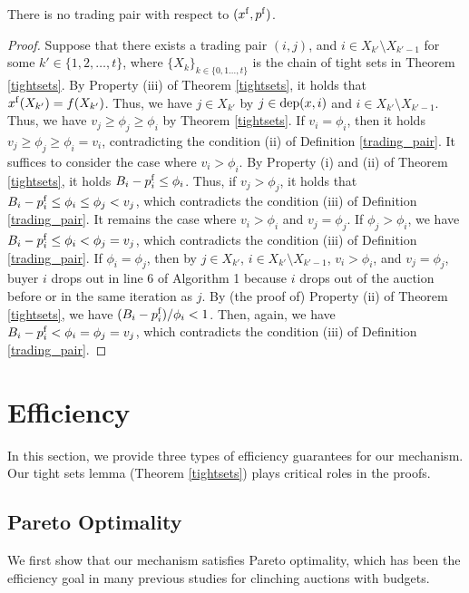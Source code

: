 \documentclass[letterpaper,11pt]{article}
\begin{document}
\begin{proposition}
\label{no_trading}
There is no trading pair with respect to $(x^{\rm f}, p^{\rm f})$.
\end{proposition}
\begin{proof}
Suppose that there exists a trading pair $(i, j)$, and $i\in X_{k'}\setminus X_{k'-1}$ for some $k'\in \{1,2,\ldots,t\}$, where $\{X_k\}_{k\in \{0,1\ldots,t\}}$ is the chain of tight sets in Theorem \ref{tightsets}.
By Property (iii) of Theorem \ref{tightsets}, it holds that $x^{\rm f}(X_{k'})=f(X_{k'})$.
Thus, we have $j\in X_{k'}$ by $j\in {\rm dep}(x, i)$ 
and $i\in X_{k'}\setminus X_{k'-1}$.
Thus, we have $v_j\geq \phi_j\geq \phi_i$ by Theorem \ref{tightsets}.
If $v_{i}=\phi_{i}$, then it holds $v_j\geq \phi_j\geq \phi_i=v_i$, 
contradicting the condition (ii) of Definition \ref{trading_pair}. 
It suffices to consider the case where $v_i>\phi_i$.
By Property (i) and (ii) of Theorem \ref{tightsets}, it holds $B_i-p^{\rm f}_i\leq \phi_i$.
Thus, if $v_j>\phi_j$, it holds that $B_i-p^{\rm f}_i\leq \phi_i\leq \phi_j<v_j$, which contradicts the condition (iii) of Definition \ref{trading_pair}. 
It remains the case where $v_i>\phi_i$ and $v_j=\phi_j$.
If $\phi_j>\phi_i$, 
we have $B_i-p^{\rm f}_i\leq\phi_i< \phi_j=v_j$, which contradicts the condition (iii) of Definition \ref{trading_pair}.
If $\phi_i=\phi_j$, then by $j\in X_{k'}$, $i\in X_{k'}\setminus X_{k'-1}$, $v_i>\phi_i$, and $v_j=\phi_j$, 
buyer $i$ drops out in line 6 of Algorithm 1 
because $i$ drops out of the auction before or in the same iteration as $j$. 
By (the proof of) Property (ii) of Theorem \ref{tightsets}, we have $(B_i-p^{\rm f}_i)/\phi_i<1$. 
Then, again, we have $B_i-p^{\rm f}_i<\phi_i=\phi_j=v_j$, 
which contradicts the condition (iii) of Definition \ref{trading_pair}.
\end{proof}





\section{Efficiency}
In this section, we provide three types of efficiency guarantees for our mechanism.
Our tight sets lemma (Theorem \ref{tightsets}) plays critical roles in the proofs.

\subsection{Pareto Optimality}
We first show that our mechanism satisfies Pareto optimality, which has been the 
efficiency goal in many previous studies for clinching auctions with budgets. 
\end{document}

